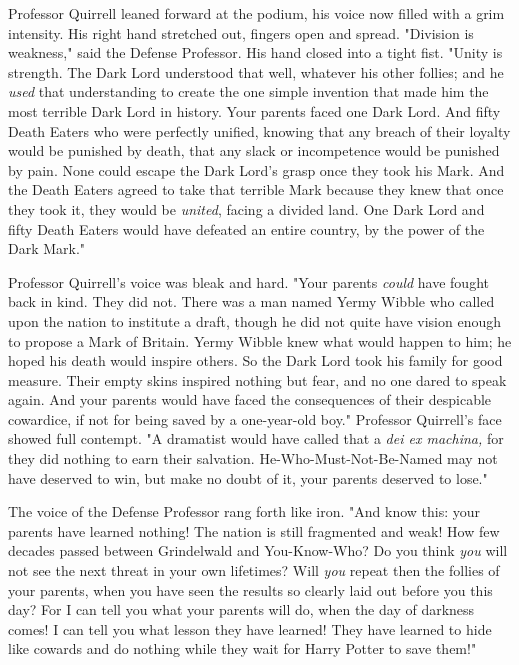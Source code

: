 Professor Quirrell leaned forward at the podium, his voice now filled with a
grim intensity. His right hand stretched out, fingers open and spread.
"Division is weakness," said the Defense Professor. His hand closed into a
tight fist. "Unity is strength. The Dark Lord understood that well, whatever
his other follies; and he \emph{used} that understanding to create the one
simple invention that made him the most terrible Dark Lord in history. Your
parents faced one Dark Lord. And fifty Death Eaters who were perfectly unified,
knowing that any breach of their loyalty would be punished by death, that any
slack or incompetence would be punished by pain. None could escape the Dark
Lord's grasp once they took his Mark. And the Death Eaters agreed to take that
terrible Mark because they knew that once they took it, they would be
\emph{united}, facing a divided land. One Dark Lord and fifty Death Eaters
would have defeated an entire country, by the power of the Dark Mark."

Professor Quirrell's voice was bleak and hard. "Your parents \emph{could} have
fought back in kind. They did not. There was a man named Yermy Wibble who
called upon the nation to institute a draft, though he did not quite have
vision enough to propose a Mark of Britain. Yermy Wibble knew what would happen
to him; he hoped his death would inspire others. So the Dark Lord took his
family for good measure. Their empty skins inspired nothing but fear, and no
one dared to speak again. And your parents would have faced the consequences of
their despicable cowardice, if not for being saved by a one-year-old boy."
Professor Quirrell's face showed full contempt. "A dramatist would have called
that a \emph{dei ex machina,} for they did nothing to earn their salvation.
He-Who-Must-Not-Be-Named may not have deserved to win, but make no doubt of it,
your parents deserved to lose."

The voice of the Defense Professor rang forth like iron. "And know this: your
parents have learned nothing! The nation is still fragmented and weak! How few
decades passed between Grindelwald and You-Know-Who? Do you think \emph{you}
will not see the next threat in your own lifetimes? Will \emph{you} repeat then
the follies of your parents, when you have seen the results so clearly laid out
before you this day? For I can tell you what your parents will do, when the day
of darkness comes! I can tell you what lesson they have learned! They have
learned to hide like cowards and do nothing while they wait for Harry Potter to
save them!"

